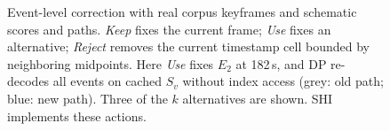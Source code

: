 \begin{figure}[t]
\centering
\resizebox{\textwidth}{!}{}
\caption{Event-level correction with real corpus keyframes and schematic scores and paths. \emph{Keep} fixes the current frame; \emph{Use} fixes an alternative; \emph{Reject} removes the current timestamp cell bounded by neighboring midpoints. Here \emph{Use} fixes $E_2$ at 182\,s, and DP re-decodes all events on cached $S_v$ without index access (grey: old path; blue: new path). Three of the $k$ alternatives are shown. SHI~\cite{nguyen2027shi} implements these actions.}
\label{fig:trail}
\end{figure}
